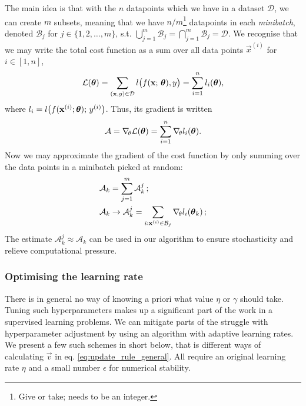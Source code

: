         The main idea is that with the $n$ datapoints which we have in a dataset $\mathcal{D}$, we can create $m$ subsets, meaning that we have $n/m$\footnote{Give or take; needs to be an integer.} datapoints in each \textit{minibatch}, denoted $\mathcal{B}_j$ for $j\in\{1,2,\dots,m\}$, s.t. $\bigcup_{j=1}^m \mathcal{B}_j = \bigcap_{j=1}^m \mathcal{B}_j = \mathcal{D}$. We recognise that we may write the total cost function as a sum over all data points $\vec{x}^{(i)}$ for $i\in[1,n]$, 
        \begin{equation}
            \mathcal{L}(\boldsymbol{\theta}) =\sum_{(\mathbf{x}, y)\in \mathcal{D}} l\big(f(\mathbf{x};\,\boldsymbol{\theta}), y \big) = \sum_{i=1}^n l_i(\boldsymbol{\theta}),
        \end{equation}
        where $l_i = l\big(f(\mathbf{x}^{(i)};\boldsymbol{\theta}); \, y^{(i)}\big)$. Thus, its gradient is written
        \begin{equation}
            \mathcal{A} = \nabla_{\!\theta} \mathcal{L}(\boldsymbol{\theta}) = \sum_{i=1}^n \nabla_{\!\theta}l_i(\boldsymbol{\theta}).
        \end{equation}
        Now we may approximate the gradient of the cost function by only summing over the data points in a minibatch picked at random:
        \begin{equation}\label{eq:sgd_gradient}
            \begin{split}
            \mathcal{A}_k &= \sum_{j=1}^{m}\mathcal{A}_k^j\, ; \\
            \mathcal{A}_k &\to \mathcal{A}^j_k = \sum_{i:\mathbf{x}^{(i)} \in\mathcal{B}_j }\nabla_{\!\theta} l_i(\boldsymbol{\theta}_k)\, ;
            \end{split}
        \end{equation}
        The estimate $\mathcal{A}_k^j \approx \mathcal{A}_k$ can be used in our algorithm to ensure stochasticity and relieve computational pressure.
    
    \subsubsection{Optimising the learning rate}\label{sec:tuning}
    
    There is in general no way of knowing a priori what value $\eta$ or $\gamma$ should take. Tuning such hyperparameters makes up a significant part of the work in a supervised learning problems. We can mitigate parts of the struggle with hyperparameter adjustment by using an algorithm with adaptive learning rates. We present a few such schemes in short below, that is different ways of calculating $\vec{v}$ in eq. \eqref{eq:update_rule_general}. All require an original learning rate $\eta$ and a small number $\epsilon$ for numerical stability. 

